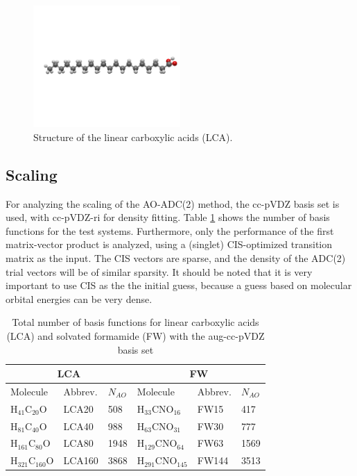 \begin{figure}
\centering
\includegraphics[width=0.5\textwidth]{Pics/acid.png}
\caption{Structure of the linear carboxylic acids (LCA).}
\label{fig:ACID}
\end{figure}

\subsection{Scaling}

For analyzing the scaling of the AO-ADC(2) method, the cc-pVDZ basis set is used, with cc-pVDZ-ri for density fitting. Table \ref{tab:ES_NUMBAS} shows the number of basis functions for the test systems. Furthermore, only the performance of the first matrix-vector product is analyzed, using a (singlet) CIS-optimized transition matrix as the input. The CIS vectors are sparse, and the density of the ADC(2) trial vectors will be of similar sparsity. It should be noted that it is very important to use CIS as the the initial guess, because a guess based on molecular orbital energies can be very dense. 

\begin{table}[h]
\centering
\begin{tabular}{llllll}
\hline
\multicolumn{3}{c}{LCA} & \multicolumn{3}{c}{FW} \\ \hline
Molecule & Abbrev. & $N_{AO}$ & Molecule & Abbrev. & $N_{AO}$ \\ \hline
H$_{41}$C$_{20}$O & LCA20 & 508 & H$_{33}$CNO$_{16}$ & FW15 & 417 \\
H$_{81}$C$_{40}$O & LCA40 & 988 & H$_{63}$CNO$_{31}$ & FW30 & 777 \\
H$_{161}$C$_{80}$O & LCA80 & 1948 & H$_{129}$CNO$_{64}$ & FW63 & 1569 \\
H$_{321}$C$_{160}$O & LCA160 & 3868 & H$_{291}$CNO$_{145}$ & FW144 & 3513 \\
\hline
\end{tabular}
\caption{Total number of basis functions for linear carboxylic acids (LCA) and solvated formamide (FW) with the aug-cc-pVDZ basis set}
\label{tab:ES_NUMBAS}
\end{table}

